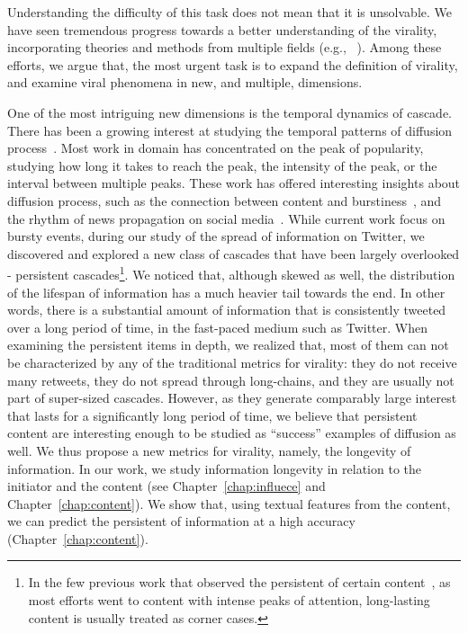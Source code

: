 \documentclass[phd,tocprelim]{cornell}
\begin{document}
Understanding the difficulty of this task does not mean that it is unsolvable. We have seen tremendous progress towards a better understanding of the virality, incorporating theories and methods from multiple fields (e.g., ~\cite{Centola:2007, Bakshy-2011}). 
Among these efforts, we argue that, the most urgent task is to expand the definition of virality, and examine viral phenomena in new, and multiple, dimensions. 

One of the most intriguing new dimensions is the temporal dynamics of cascade. There has been a growing interest at studying the temporal patterns of diffusion process~\cite{Yang-2011,crane:2008,Leskovec:2005,Leskovec-Newscycle-2009}. Most work in domain has concentrated on the peak of popularity, studying how long it takes to reach the peak, the intensity of the peak, or the interval between multiple peaks. These work has offered interesting insights about diffusion process, such as the connection between content and burstiness~\cite{crane:2008}, and the rhythm of news propagation on social media~\cite{Leskovec-Newscycle-2009}. While current work focus on bursty events, during our study of the spread of information on Twitter, we discovered and explored a new class of cascades that have been largely overlooked - persistent cascades\footnote{In the few previous work that observed the persistent of certain content~\cite{crane:2008,Szabo-2010}, as most efforts went to content with intense peaks of attention, long-lasting content is usually treated as corner cases.}. We noticed that,  although skewed as well, the distribution of the lifespan of information has a much heavier tail towards the end. In other words, there is a substantial amount of information that is consistently tweeted over a long period of time, in the fast-paced medium such as Twitter. When examining the persistent items in depth, we realized that, most of them can not be characterized by any of the traditional metrics for virality: they do not receive many retweets, they do not spread through long-chains, and they are usually not part of super-sized cascades. However, as they generate comparably large interest that lasts for a significantly long period of time, we believe that persistent content are interesting enough to be studied as ``success'' examples of diffusion as well. We thus propose a new metrics for virality, namely, the longevity of information. In our work, we study information longevity in relation to the initiator and the content (see Chapter~\ref{chap:influece} and Chapter~\ref{chap:content}). We show that, using textual features from the content, we can predict the persistent of information at a high accuracy (Chapter~\ref{chap:content}).
\end{document}

